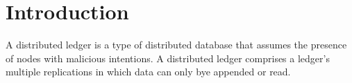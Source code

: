 \section{Introduction}
\label{sec:introduction}

A distributed ledger is a type of distributed database that assumes the presence of nodes with malicious intentions.
A distributed ledger comprises a ledger's multiple replications in which data can only bye appended or read.